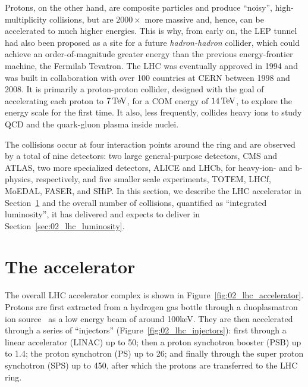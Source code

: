 Protons, on the other hand, are composite particles and produce ``noisy'', high-multiplicity collisions, but are $2000\times$ more massive and, hence, can be accelerated to much higher energies.
This is why, from early on, the LEP tunnel had also been proposed as a site for a future \textit{hadron-hadron} collider, which could achieve an order-of-magnitude greater energy than the previous energy-frontier machine, the Fermilab Tevatron.
The LHC was eventually approved in 1994 and was built in collaboration with over 100 countries at CERN between 1998 and 2008.
It is primarily a proton-proton collider, designed with the goal of accelerating each proton to $7\,\text{Te\hspace{-.08em}V}$, for a COM energy of $14\,\text{Te\hspace{-.08em}V}$, to explore the \TeV energy scale for the first time.
It also, less frequently, collides heavy ions to study QCD and the quark-gluon plasma inside nuclei.

The collisions occur at four interaction points around the ring and are observed by a total of nine detectors: two large general-purpose detectors, CMS and ATLAS, two more specialized detectors, ALICE and LHCb, for heavy-ion- and b-physics, respectively, and five smaller scale experiments, TOTEM, LHCf, MoEDAL, FASER, and SHiP.
In this section, we describe the LHC accelerator in Section~\ref{sec:02_lhc_accelerator} and the overall number of collisions, quantified as ``integrated luminosity'', it has delivered and expects to deliver in Section~\ref{sec:02_lhc_luminosity}.

\section{The accelerator}
\label{sec:02_lhc_accelerator}

The overall LHC accelerator complex is shown in Figure~\ref{fig:02_lhc_accelerator}.
Protons are first extracted from a hydrogen gas bottle through a duoplasmatron ion source~\cite{wolf1995handbook} as a low energy beam of around 100\unit{keV}.
They are then accelerated through a series of ``injectors'' (Figure~\ref{fig:02_lhc_injectors}): first through a linear accelerator (LINAC) up to 50\MeV; then a proton synchotron booster (PSB) up to 1.4\GeV; the proton synchotron (PS) up to 26\GeV; and finally through the super proton synchotron (SPS) up to 450\GeV, after which the protons are transferred to the LHC ring.

